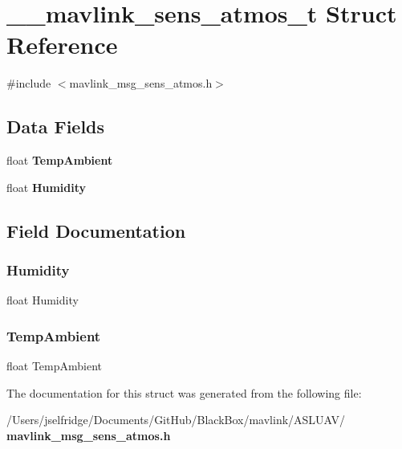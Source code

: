 \section{\+\_\+\+\_\+mavlink\+\_\+sens\+\_\+atmos\+\_\+t Struct Reference}
\label{struct____mavlink__sens__atmos__t}


{\ttfamily \#include $<$mavlink\+\_\+msg\+\_\+sens\+\_\+atmos.\+h$>$}

\subsection*{Data Fields}
\begin{DoxyCompactItemize}
\item 
float \textbf{ Temp\+Ambient}
\item 
float \textbf{ Humidity}
\end{DoxyCompactItemize}


\subsection{Field Documentation}
\mbox{\label{struct____mavlink__sens__atmos__t_afe6173f00c89e1ccfe06abd8502ff19f}} 
\subsubsection{Humidity}
{\footnotesize\ttfamily float Humidity}

\mbox{\label{struct____mavlink__sens__atmos__t_adc06824728fecccfc30ce1c8d1de576b}} 
\subsubsection{Temp\+Ambient}
{\footnotesize\ttfamily float Temp\+Ambient}



The documentation for this struct was generated from the following file\+:\begin{DoxyCompactItemize}
\item 
/\+Users/jselfridge/\+Documents/\+Git\+Hub/\+Black\+Box/mavlink/\+A\+S\+L\+U\+A\+V/\textbf{ mavlink\+\_\+msg\+\_\+sens\+\_\+atmos.\+h}\end{DoxyCompactItemize}
